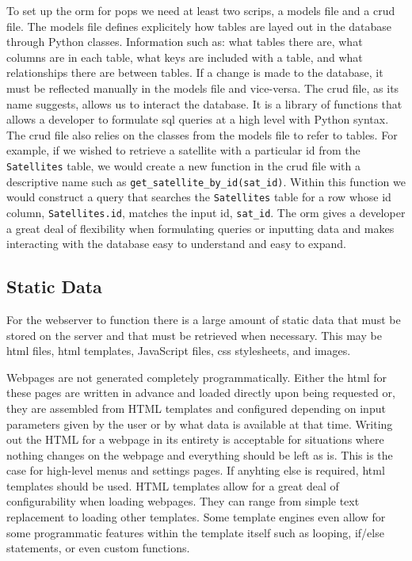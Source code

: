 To set up the \gls{orm} for \gls{pops} we need at least two scrips, a models
file and a \gls{crud} file. The models file defines explicitely how tables are
layed out in the database through Python classes. Information such as: what
tables there are, what columns are in each table, what keys are included with a
table, and what relationships there are between tables. If a change is made to
the database, it must be reflected manually in the models file and vice-versa.
The \gls{crud} file, as its name suggests, allows us to interact the database.
It is a library of functions that allows a developer to formulate \gls{sql}
queries at a high level with Python syntax. The \gls{crud} file also relies on
the classes from the models file to refer to tables. For example, if we wished
to retrieve a satellite with a particular id from the \texttt{Satellites}
table, we would create a new function in the crud file with a descriptive name
such as \texttt{get\_satellite\_by\_id(sat\_id)}. Within this function we would
construct a query that searches the \texttt{Satellites} table for a row whose
id column, \texttt{Satellites.id}, matches the input id, \texttt{sat\_id}. The
\gls{orm} gives a developer a great deal of flexibility when formulating
queries or inputting data and makes interacting with the database easy to
understand and easy to expand.


\subsection{Static Data}

For the webserver to function there is a large amount of static data that must
be stored on the server and that must be retrieved when necessary. This may be
\gls{html} files, \gls{html} templates, JavaScript files, \gls{css}
stylesheets, and images.

Webpages are not generated completely programmatically. Either the \gls{html}
for these pages are written in advance and loaded directly upon being requested
or, they are assembled from HTML templates and configured depending on input
parameters given by the user or by what data is available at that time. Writing
out the HTML for a webpage in its entirety is acceptable for situations where
nothing changes on the webpage and everything should be left as is. This is the
case for high-level menus and settings pages. If anyhting else is required,
\gls{html} templates should be used. HTML templates allow for a great deal of
configurability when loading webpages. They can range from simple text
replacement to loading other templates. Some template engines even allow for
some programmatic features within the template itself such as looping, if/else
statements, or even custom functions.


